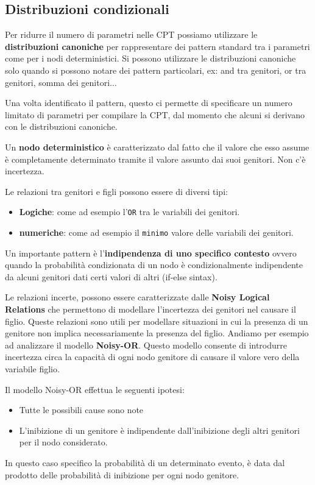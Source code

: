 \subsection{Distribuzioni condizionali}
Per ridurre il numero di parametri nelle CPT possiamo utilizzare le \textbf{distribuzioni
    canoniche} per rappresentare dei pattern standard tra i parametri come per
i nodi deterministici. Si possono utilizzare le distribuzioni canoniche solo
quando si possono notare dei pattern particolari, ex: and tra genitori, or tra
genitori, somma dei genitori$\dots$

Una volta identificato il pattern, questo ci permette di specificare un numero
limitato di parametri per compilare la CPT, dal momento che alcuni si derivano
con le distribuzioni canoniche.
\begin{definizione}
    Un \textbf{nodo deterministico} è caratterizzato dal fatto che il valore che
    esso assume è completamente determinato tramite il valore assunto dai suoi
    genitori. Non c'è incertezza.
\end{definizione}
Le relazioni tra genitori e figli possono essere di diversi tipi:
\begin{itemize}
    \item \textbf{Logiche}: come ad esempio l'\texttt{OR} tra le variabili dei genitori.
    \item \textbf{numeriche}: come ad esempio il \texttt{minimo} valore delle
          variabili dei genitori.
\end{itemize}
Un importante pattern è l'\textbf{indipendenza di uno specifico contesto} ovvero
quando la probabilità condizionata di un nodo è condizionalmente indipendente
da alcuni genitori dati certi valori di altri (if-else sintax).

Le relazioni incerte, possono essere caratterizzate dalle \textbf{Noisy Logical
    Relations} che permettono di modellare l'incertezza dei genitori nel causare
il figlio. Queste relazioni sono utili per modellare situazioni in cui la presenza
di un genitore non implica necessariamente la presenza del figlio.
Andiamo per esempio ad analizzare il modello \textbf{Noisy-OR}. Questo modello
consente di introdurre incertezza circa la capacità di ogni nodo genitore di
causare il valore vero della variabile figlio.

Il modello Noisy-OR effettua le seguenti ipotesi:
\begin{itemize}
    \item Tutte le possibili cause sono note
    \item L'inibizione di un genitore è indipendente dall'inibizione degli altri
          genitori per il nodo considerato.
\end{itemize}
In questo caso specifico la probabilità di un determinato evento, è data dal
prodotto delle probabilità di inibizione per ogni nodo genitore.
